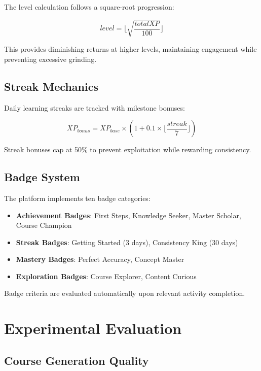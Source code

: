 \documentclass[conference]{IEEEtran}
\begin{document}
The level calculation follows a square-root progression:

\begin{equation}
level = \lfloor \sqrt{\frac{totalXP}{100}} \rfloor
\end{equation}

This provides diminishing returns at higher levels, maintaining engagement while preventing excessive grinding.

\subsection{Streak Mechanics}

Daily learning streaks are tracked with milestone bonuses:

\begin{equation}
XP_{bonus} = XP_{base} \times (1 + 0.1 \times \lfloor \frac{streak}{7} \rfloor)
\end{equation}

Streak bonuses cap at 50\% to prevent exploitation while rewarding consistency.

\subsection{Badge System}

The platform implements ten badge categories:

\begin{itemize}
    \item \textbf{Achievement Badges}: First Steps, Knowledge Seeker, Master Scholar, Course Champion
    \item \textbf{Streak Badges}: Getting Started (3 days), Consistency King (30 days)
    \item \textbf{Mastery Badges}: Perfect Accuracy, Concept Master
    \item \textbf{Exploration Badges}: Course Explorer, Content Curious
\end{itemize}

Badge criteria are evaluated automatically upon relevant activity completion.

\section{Experimental Evaluation}

\subsection{Course Generation Quality}
\end{document}

